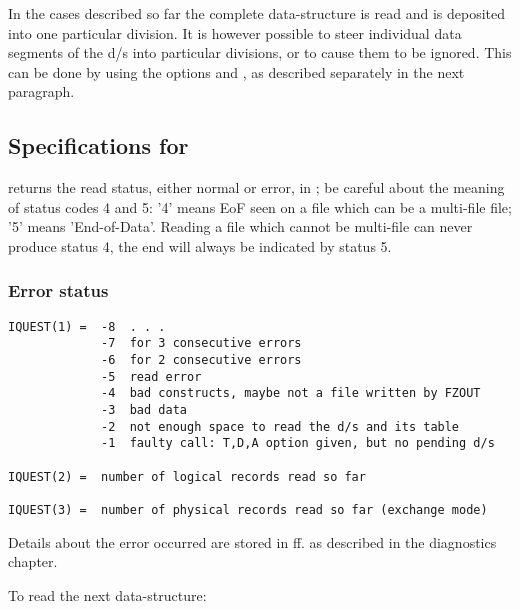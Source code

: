 In the cases described so far the complete data-structure is
read and is deposited into one particular division.
It is however possible to steer individual data segments of
the d/s into particular divisions, or to cause them to be ignored.
This can be done by using the options  and ,
as described separately in the next paragraph.

\subsection*{Specifications for }

 returns the read status, either normal or error, in ;
be careful about the meaning of status codes 4 and 5:
'4' means EoF seen on a file which can be a multi-file file;
'5' means 'End-of-Data'.
Reading a file which cannot be multi-file can never
produce status 4, the end will always be indicated by status 5.

\subsubsection*{Error status}

\begin{verbatim}
IQUEST(1) =  -8  . . .
             -7  for 3 consecutive errors
             -6  for 2 consecutive errors
             -5  read error
             -4  bad constructs, maybe not a file written by FZOUT
             -3  bad data
             -2  not enough space to read the d/s and its table
             -1  faulty call: T,D,A option given, but no pending d/s

IQUEST(2) =  number of logical records read so far

IQUEST(3) =  number of physical records read so far (exchange mode)
\end{verbatim}
Details about the error occurred are stored in  ff.
as described in the diagnostics chapter.

To read the next data-structure:

